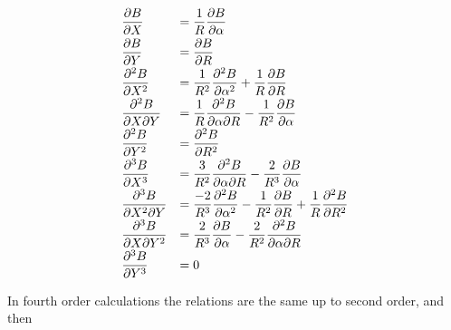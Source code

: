  \begin{equation}
{\renewcommand{\arraystretch}{2}
	 \begin{array}{ll}
		 \dfrac{ \partial B }{ \partial X} 
		      &  = \dfrac{ 1 }{ R} \dfrac{\partial B }{ \partial \alpha} \\
		 \dfrac{ \partial B }{ \partial Y}
		      & = \dfrac{ \partial B }{ \partial R}\\
		\dfrac{\partial^2 B }{ \partial X^2} 
		      & =   \dfrac{ 1}{ R^2} \dfrac{\partial^2 B }{ \partial \alpha^ 2} 
		         + \dfrac{1 }{ R} \dfrac{\partial B}{\partial R}\\
		 \dfrac{ \partial^2 B }{ \partial X\partial Y}
		      & =  \dfrac{ 1 }{ R} \dfrac{\partial^ 2 B}{\partial \alpha \partial R}
		         - \dfrac{1 }{ R^2} \dfrac{\partial B }{ \partial\alpha}\\
		\dfrac{ \partial^2 B }{\partial Y^2}   
		      & =  \dfrac{ \partial^2 B }{ \partial R^2} \\
		 \dfrac{ \partial^3 B }{ \partial X^3} 
		      & = \dfrac{ 3 }{ R^2} \dfrac{\partial^2 B }{ \partial \alpha \partial R} 
		        - \dfrac{2 }{ R^3} \dfrac{\partial B }{ \partial \alpha}\\
		\dfrac{\partial^3 B }{ \partial X^2\partial Y} 
		      & = \dfrac{ -2 }{ R^3} \dfrac{\partial^2 B }{ \partial \alpha^2} 
		        - \dfrac{1}{ R^2} \dfrac{\partial B }{ \partial R} 
		        + \dfrac{1 }{ R} \dfrac{\partial^2 B }{\partial R^2}\\
		 \dfrac{ \partial^3 B }{ \partial X\partial Y^2} 
		      & =  \dfrac{ 2 }{ R^3} \dfrac{\partial B}{\partial \alpha} 
		         - \dfrac{2 }{ R^2} \dfrac{\partial^2 B }{ \partial \alpha\partial R}\\
		\dfrac{ \partial^3 B }{ \partial Y^3} 
		      &  =  0
	 \end{array} 
 	\label{eq2-4-8}}
 \end{equation}
 

  \noindent In fourth order calculations the relations are the same up to second
order, and then  

